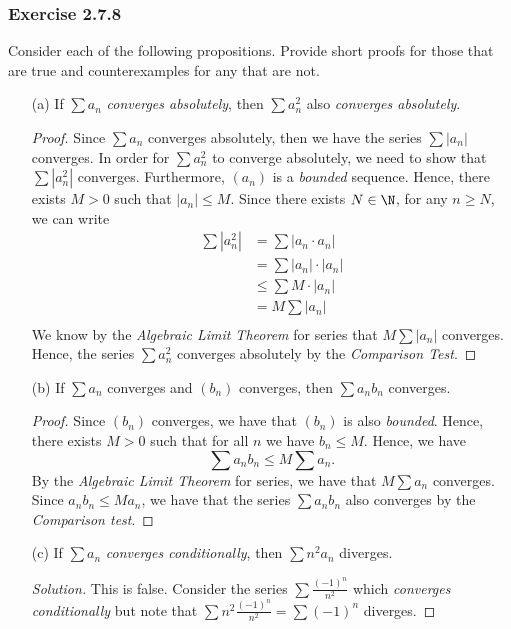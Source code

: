 \subsubsection{Exercise 2.7.8}

Consider each of the following propositions. Provide short proofs for those that are true and counterexamples for any that are not.

\begin{enumerate}
    \item[(a)] If \( \sum a_n \) \textit{converges absolutely}, then \( \sum a_n^2\) also \textit{converges absolutely}.
        \begin{proof}
        Since \( \sum a_n \) converges absolutely, then we have the series \( \sum |a_n| \) converges. In order for \( \sum a_n^2 \) to converge absolutely, we need to show that \( \sum | a_n^2 |\) converges. Furthermore, \( (a_n) \) is a \textit{bounded} sequence. Hence, there exists \( M > 0 \) such that \( |a_n| \leq M \). Since there exists \( N \in \N \), for any \( n \geq N \), we can write
        \begin{align*}
            \sum |a_n^2|&= \sum | a_n \cdot a_n |  \\
                        &= \sum |a_n | \cdot |a_n | \\
                        &\leq \sum M \cdot |a_n | \\
                        &= M \sum |a_n| \\
        \end{align*}
        We know by the \textit{Algebraic Limit Theorem} for series that \( M \sum |a_n|\) converges. Hence, the series \( \sum a_n^2 \) converges absolutely by the \textit{Comparison Test}.
        \end{proof}
    \item[(b)] If \( \sum a_n \) converges and \( (b_n)\) converges, then \( \sum a_n b_n \) converges. 
        \begin{proof}
        Since \( (b_n)\) converges, we have that \( (b_n)\) is also \textit{bounded}. Hence, there exists \( M > 0 \) such that for all \( n \) we have \( b_n \leq M \). Hence, we have 
        \[ \sum a_n b_n \leq M \sum a_n. \]
        By the \textit{Algebraic Limit Theorem} for series, we have that \( M \sum a_n \) converges. Since \( a_n b_n \leq Ma_n \), we have that the series \( \sum a_n b_n \) also converges by the \textit{Comparison test}.
        \end{proof}
    \item[(c)] If \( \sum a_n \) \textit{converges conditionally}, then \(\sum n^2 a_n \) diverges. \begin{proof}[Solution]
   This is false. Consider the series \( \sum \frac{(-1)^n}{n^2}\) which \textit{converges conditionally} but note that \( \sum n^2 \frac{(-1)^n}{n^2} = \sum (-1)^n\) diverges. 
\end{proof}
\end{enumerate}

